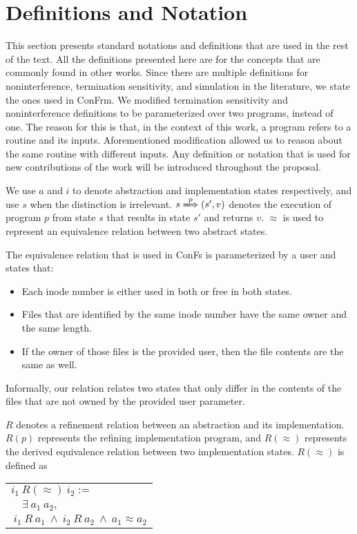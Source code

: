 \section{Definitions and Notation}
This section presents standard notations and definitions that are used in the rest of the text. All the definitions presented here are for the concepts that are commonly found in other works. Since there are multiple definitions for noninterference, termination sensitivity, and simulation in the literature, we state the ones used in ConFrm. We modified termination sensitivity and noninterference definitions to be parameterized over two programs, instead of one. The reason for this is that, in the context of this work, a program refers to a routine and its inputs. Aforementioned modification allowed us to reason about the same routine with different inputs. Any definition or notation that is used for new contributions of the work will be introduced throughout the proposal.

We use $a$ and $i$ to denote abstraction and implementation states respectively, and use $s$ when the distinction is irrelevant.
$s \xLongrightarrow{p} (s', v)$ denotes the execution of program $p$ from state $s$ that results in state $s'$ and returns $v$. $\approx$ is used to represent an equivalence relation between two abstract states. 

The equivalence relation that is used in ConFs is parameterized by a user and states that: 
\begin{itemize}
	\item Each inode number is either used in both or free in both states.
	\item Files that are identified by the same inode number have the same owner and the same length. 
	\item If the owner of those files is the provided user, then the file contents are the same as well.
\end{itemize}

Informally, our relation relates two states that only differ in the contents of the files that are not owned by the provided user parameter. 

$R$ denotes a refinement relation between an abstraction and its implementation. $R(p)$ represents the refining implementation program, and $R(\approx)$ represents the derived equivalence relation between two implementation states. $R(\approx)$ is defined as\\
 
\begin{center}
	\begin{tabular}{l}
		$i_1\ R(\approx)\ i_2 :=$\\
		$\quad \exists\ a_1\ a_2,$\\
		$\ i_1\ R\ a_1\ \wedge\ i_2\ R\ a_2\ \wedge\ a_1 \approx a_2$
	\end{tabular}
\end{center}



